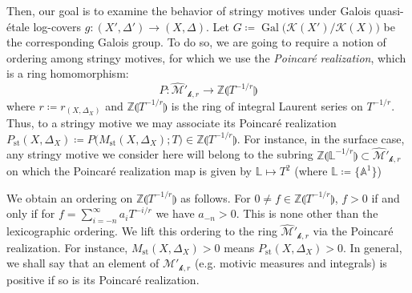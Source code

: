 \documentclass[12pt]{amsart}
\theoremstyle{plain}   %
\theoremstyle{definition}    %
\theoremstyle{remark}    %
\numberwithin{equation}{theorem}
\DeclareMathOperator{\Gal}{{Gal}}
\newcommand{\kay}{\mathcal{k}}
\newcommand{\sK}{\mathcal{K}}
\newcommand{\sM}{\mathcal{M}}
\newcommand{\bA}{\mathbb{A}}
\newcommand{\bL}{\mathbb{L}}
\newcommand{\bZ}{\mathbb{Z}}
\begin{document}
Then, our goal is to examine the behavior of stringy motives under Galois quasi-\'etale log-covers $g\colon (X',\Delta') \to (X,\Delta)$. Let $G \coloneqq \Gal\big(\sK(X')/\sK(X)\big)$ be the corresponding Galois group. To do so, we are going to require a notion of ordering among stringy motives, for which we use the \emph{Poincar\'e realization}, which is a ring homomorphism:
\[
P \colon \hat{\sM}'_{\kay,r} \to \bZ\llparenthesis T^{-1/r} \rrparenthesis
\]
where $r \coloneqq r_{(X,\Delta_X)}$ and $\bZ\llparenthesis T^{-1/r} \rrparenthesis$ is the ring of integral Laurent series on $T^{-1/r}$. Thus, to a stringy motive we may associate its Poincar\'e realization $P_{\mathrm{st}}(X,\Delta_X) \coloneqq P\big(M_{\mathrm{st}}(X,\Delta_X);T \big) \in \bZ\llparenthesis T^{-1/r} \rrparenthesis$. For instance, in the surface case, any stringy motive we consider here will belong to the subring $\bZ \llparenthesis \bL^{-1/r} \rrparenthesis \subset \hat{\sM}'_{\kay,r}$ on which the Poincaré realization map is given by $\bL \mapsto T^2$ (where $\bL \coloneqq \{\bA^1\}$)

We obtain an ordering on $\bZ\llparenthesis T^{-1/r} \rrparenthesis$ as follows. For $0 \neq f \in \bZ\llparenthesis T^{-1/r} \rrparenthesis$, $f>0$ if and only if for $f = \sum_{i=-n}^{\infty} a_i T^{-i/r}$ we have $a_{-n}>0$. This is none other than the lexicographic ordering. We lift this ordering to the ring $\hat{\sM}'_{\kay,r}$ via the Poincar\'e realization. For instance, $M_{\mathrm{st}}(X,\Delta_X) > 0$ means $P_{\mathrm{st}}(X,\Delta_X)>0$. In general, we shall say that an element of $\hat{\sM}'_{\kay,r}$ (e.g. motivic measures and integrals) is positive if so is its Poincaré realization.
\end{document}
